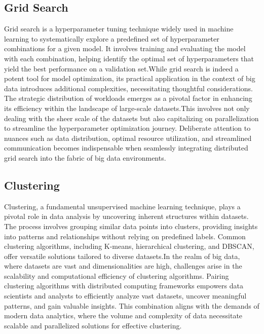 \documentclass[conference]{IEEEtran}
\begin{document}
\subsection{Grid Search\cite{b10}}
Grid search is a hyperparameter tuning technique widely used in machine learning to systematically explore a predefined set of hyperparameter combinations for a given model. It involves training and evaluating the model with each combination, helping identify the optimal set of hyperparameters that yield the best performance on a validation set.While grid search is indeed a potent tool for model optimization, its practical application in the context of big data introduces additional complexities, necessitating thoughtful considerations. The strategic distribution of workloads emerges as a pivotal factor in enhancing its efficiency within the landscape of large-scale datasets.This involves not only dealing with the sheer scale of the datasets but also capitalizing on parallelization to streamline the hyperparameter optimization journey. Deliberate attention to nuances such as data distribution, optimal resource utilization, and streamlined communication becomes indispensable when seamlessly integrating distributed grid search into the fabric of big data environments.

\subsection{Clustering\cite{b11}}
Clustering, a fundamental unsupervised machine learning technique, plays a pivotal role in data analysis by uncovering inherent structures within datasets. The process involves grouping similar data points into clusters, providing insights into patterns and relationships without relying on predefined labels. Common clustering algorithms, including K-means, hierarchical clustering, and DBSCAN, offer versatile solutions tailored to diverse datasets.In the realm of big data, where datasets are vast and dimensionalities are high, challenges arise in the scalability and computational efficiency of clustering algorithms. Pairing clustering algorithms with distributed computing frameworks empowers data scientists and analysts to efficiently analyze vast datasets, uncover meaningful patterns, and gain valuable insights. This combination aligns with the demands of modern data analytics, where the volume and complexity of data necessitate scalable and parallelized solutions for effective clustering.
\end{document}
